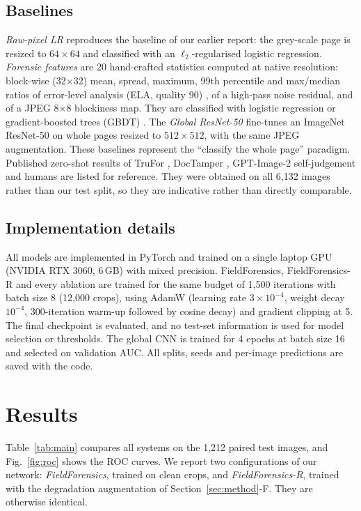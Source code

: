 \documentclass[conference]{IEEEtran}
\begin{document}
\subsection{Baselines}
\emph{Raw-pixel LR} reproduces the baseline of our earlier report: the grey-scale page is resized to $64\times64$ and classified with an $\ell_2$-regularised logistic regression. \emph{Forensic features} are 20 hand-crafted statistics computed at native resolution: block-wise (32$\times$32) mean, spread, maximum, 99th percentile and max/median ratios of error-level analysis (ELA, quality 90) \cite{ela}, of a high-pass noise residual, and of a JPEG 8$\times$8 blockiness map. They are classified with logistic regression or gradient-boosted trees (GBDT) \cite{sklearn}. The \emph{Global ResNet-50} fine-tunes an ImageNet ResNet-50 \cite{resnet} on whole pages resized to $512\times512$, with the same JPEG augmentation. These baselines represent the ``classify the whole page'' paradigm. Published zero-shot results of TruFor \cite{trufor}, DocTamper \cite{doctamper}, GPT-Image-2 self-judgement and humans \cite{aiforge2} are listed for reference. They were obtained on all 6,132 images rather than our test split, so they are indicative rather than directly comparable.

\subsection{Implementation details}
All models are implemented in PyTorch \cite{pytorch} and trained on a single laptop GPU (NVIDIA RTX 3060, 6\,GB) with mixed precision. FieldForensics, FieldForensics-R and every ablation are trained for the same budget of 1,500 iterations with batch size 8 (12,000 crops), using AdamW \cite{adamw} (learning rate $3\times10^{-4}$, weight decay $10^{-4}$, 300-iteration warm-up followed by cosine decay) and gradient clipping at 5. The final checkpoint is evaluated, and no test-set information is used for model selection or thresholds. The global CNN is trained for 4 epochs at batch size 16 and selected on validation AUC. All splits, seeds and per-image predictions are saved with the code.

\section{Results}\label{sec:results}
Table~\ref{tab:main} compares all systems on the 1,212 paired test images, and Fig.~\ref{fig:roc} shows the ROC curves. We report two configurations of our network: \emph{FieldForensics}, trained on clean crops, and \emph{FieldForensics-R}, trained with the degradation augmentation of Section~\ref{sec:method}-F. They are otherwise identical.
\end{document}

